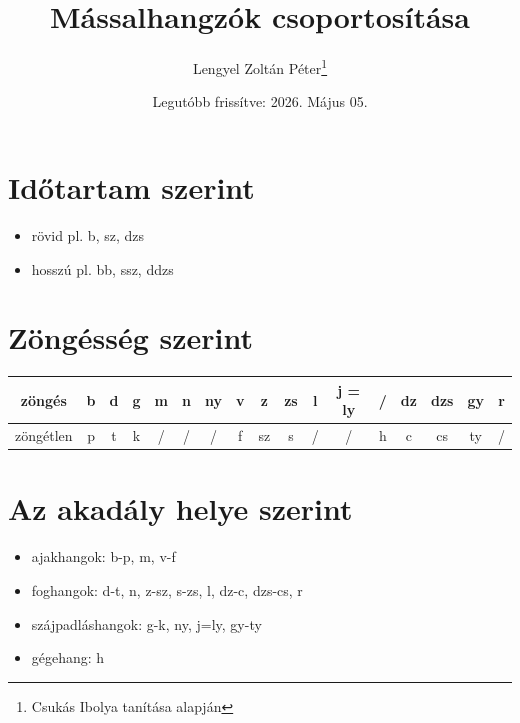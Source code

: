 \documentclass{article}
\title{Mássalhangzók csoportosítása}
\author{Lengyel Zoltán Péter\thanks{Csukás Ibolya tanítása alapján}}
\date{Legutóbb frissítve: 2026. Május 05.}
\begin{document}
\maketitle
\tableofcontents
\newpage

\section{Időtartam szerint}
\begin{itemize}
    \item rövid pl. b, sz, dzs
    \item hosszú pl. bb, ssz, ddzs
\end{itemize}

\section{Zöngésség szerint}
 \begin{tabular}{|c|c|c|c|c|c|c|c|c|c|c|c|c|c|c|c|c|} \hline
      zöngés & \cellcolor{red!25}b & \cellcolor{blue!25}d & \cellcolor{yellow!25}g & \cellcolor{red!25}m & \cellcolor{blue!25}n & \cellcolor{yellow!25}ny & \cellcolor{red!25}v & \cellcolor{blue!25}z & \cellcolor{blue!25}zs & \cellcolor{blue!25}l & \cellcolor{yellow!25}j = ly & / & \cellcolor{blue!25}dz & \cellcolor{blue!25}dzs & \cellcolor{yellow!25}gy & \cellcolor{blue!25}r \\ \hline
      zöngétlen & \cellcolor{red!25}p & \cellcolor{blue!25}t & \cellcolor{yellow!25}k & / & / & / & \cellcolor{red!25}f & \cellcolor{blue!25}sz & \cellcolor{blue!25}s & / & / & \cellcolor{green!25}h & \cellcolor{blue!25}c & \cellcolor{blue!25}cs & \cellcolor{yellow!25}ty & / \\ \hline
 \end{tabular}

 \section{Az akadály helye szerint}

 \begin{itemize}
     \color{red!100}\item ajakhangok: b-p, m, v-f 
    \color{blue!100} \item foghangok: d-t, n, z-sz, s-zs, l, dz-c, dzs-cs, r
     \color{yellow!100}\item szájpadláshangok: g-k, ny, j=ly, gy-ty
     \color{green!100}\item gégehang: h 
 \end{itemize} \color{black!100}
\end{document}
